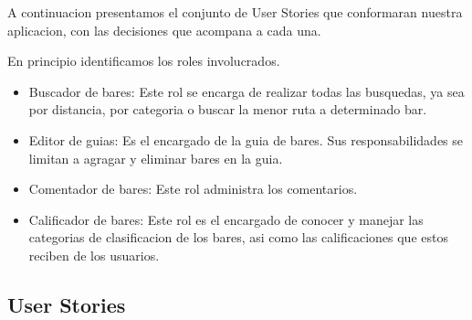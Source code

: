 A continuacion presentamos el conjunto de User Stories que conformaran nuestra aplicacion, con las decisiones que acompana a cada una.

En principio identificamos los roles involucrados.
\begin{itemize}
 \item Buscador de bares: Este rol se encarga de realizar todas las busquedas, ya sea por distancia, por categoria o buscar la menor ruta a determinado bar.
 \item Editor de guias: Es el encargado de la guia de bares. Sus responsabilidades se limitan a agragar y eliminar bares en la guia.
 \item Comentador de bares: Este rol administra los comentarios.
 \item Calificador de bares: Este rol es el encargado de conocer y manejar las categorias de clasificacion de los bares, asi como las calificaciones que estos reciben de los usuarios.
\end{itemize}

\subsection{User Stories}
